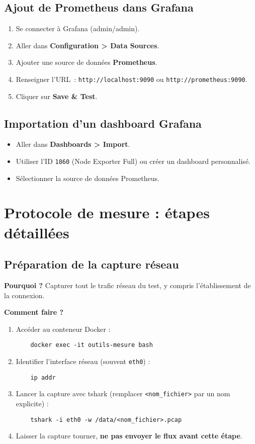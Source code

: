\documentclass[a4paper,12pt]{article}
\begin{document}
\subsection{Ajout de Prometheus dans Grafana}
\begin{enumerate}[label=\alph*)]
    \item Se connecter à Grafana (admin/admin).
    \item Aller dans \textbf{Configuration > Data Sources}.
    \item Ajouter une source de données \textbf{Prometheus}.
    \item Renseigner l’URL : \texttt{http://localhost:9090} ou \texttt{http://prometheus:9090}.
    \item Cliquer sur \textbf{Save \& Test}.
\end{enumerate}

\subsection{Importation d’un dashboard Grafana}
\begin{itemize}
    \item Aller dans \textbf{Dashboards > Import}.
    \item Utiliser l’ID \texttt{1860} (Node Exporter Full) ou créer un dashboard personnalisé.
    \item Sélectionner la source de données Prometheus.
\end{itemize}

\section{Protocole de mesure : étapes détaillées}

\subsection{Préparation de la capture réseau}
\textbf{Pourquoi ?} Capturer tout le trafic réseau du test, y compris l’établissement de la connexion.

\textbf{Comment faire ?}
\begin{enumerate}[label=\alph*)]
    \item Accéder au conteneur Docker :
    \begin{verbatim}
    docker exec -it outils-mesure bash
    \end{verbatim}
    \item Identifier l’interface réseau (souvent \texttt{eth0}) :
    \begin{verbatim}
    ip addr
    \end{verbatim}
    \item Lancer la capture avec tshark (remplacer \texttt{<nom\_fichier>} par un nom explicite) :
    \begin{verbatim}
    tshark -i eth0 -w /data/<nom_fichier>.pcap
    \end{verbatim}
    \item Laisser la capture tourner, \textbf{ne pas envoyer le flux avant cette étape}.
\end{enumerate}
\end{document}
